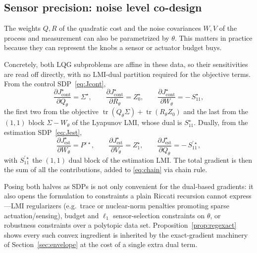 \documentclass[twocolumn,amsthm]{autart}
\begin{document}
\subsection{Sensor precision: noise level co-design}\label{sec:weights}
The weights $Q, R$ of the quadratic cost and the noise covariances $W, V$ of the
process and measurement can also be parametrized by $\theta$. This matters in practice because they can represent the knobs a sensor or actuator budget buys.

Concretely, both LQG subproblems are affine in these data, so their sensitivities
are read off directly, with no LMI-dual partition required for the objective
terms. From the control SDP~\eqref{eq:Jcont},
\begin{equation}\label{eq:gradQRcont}
\frac{\partial J_{\mathrm{cont}}^\star}{\partial Q_\theta} = \Sigma^\star,\qquad
\frac{\partial J_{\mathrm{cont}}^\star}{\partial R_\theta} = Z_0^\star,\qquad
\frac{\partial J_{\mathrm{cont}}^\star}{\partial W_\theta} = -\,S_{11}^\star,
\end{equation}
the first two from the objective $\operatorname{tr}(Q_\theta\Sigma)+\operatorname{tr}(R_\theta Z_0)$ and the
last from the $(1,1)$ block $\Sigma-W_\theta$ of the Lyapunov LMI, whose dual is
$S_{11}^\star$. Dually, from the estimation SDP~\eqref{eq:Jest},
\begin{equation}\label{eq:gradQRest}
\frac{\partial J_{\mathrm{est}}^\star}{\partial W_\theta} = P^{\varepsilon\star},\qquad
\frac{\partial J_{\mathrm{est}}^\star}{\partial V_\theta} = Z_1^\star,\qquad
\frac{\partial J_{\mathrm{est}}^\star}{\partial Q_\theta} = -\,S_{11}^{\prime\star},
\end{equation}
with $S_{11}^{\prime\star}$ the $(1,1)$ dual block of the estimation LMI. The total gradient is then the sum of all the contributions, added to \eqref{eq:chain} via chain rule.

\begin{rem}
Posing both halves as SDPs is not only convenient for the dual-based gradients:
it also opens the formulation to constraints a plain Riccati recursion cannot
express---LMI regularizers (e.g.\ trace or nuclear-norm penalties promoting sparse
actuation/sensing), budget and $\ell_1$ sensor-selection constraints on $\theta$,
or robustness constraints over a polytopic data set. Proposition~\ref{prop:regexact}
shows every such convex ingredient is inherited by the exact-gradient machinery of
Section~\ref{sec:envelope} at the cost of a single extra dual term.
\end{rem}
\end{document}
